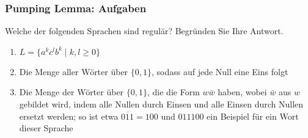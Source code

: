 \documentclass{beamer}
\begin{document}
\begin{frame}
\frametitle{Pumping Lemma: Aufgaben}
Welche der folgenden Sprachen sind regulär? Begründen Sie Ihre Antwort.

\begin{enumerate}
\item $L=\{a^kc^lb^k \mid k, l \geq 0 \}$
\item Die Menge aller Wörter über $\{0, 1\}$, sodass auf jede Null eine Eins folgt
\item Die Menge der Wörter über $\{0, 1\}$, die die Form $w\bar{w}$ haben, wobei $\bar{w}$ aus $w$ gebildet
wird, indem alle Nullen durch Einsen und alle Einsen durch Nullen ersetzt werden; so ist etwa 
$\overline{011}=100$ und $011100$ ein Beispiel für ein Wort dieser Sprache
\end{enumerate}

\end{frame}
\end{document}
